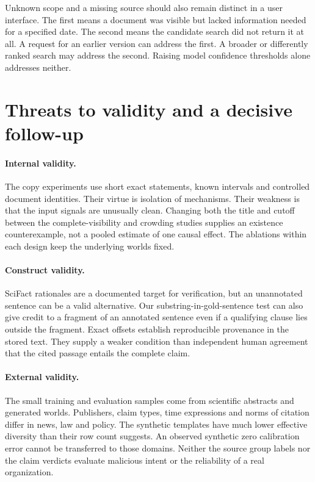 Unknown scope and a missing source should also remain distinct in a user interface. The first means a document was visible but lacked information needed for a specified date. The second means the candidate search did not return it at all. A request for an earlier version can address the first. A broader or differently ranked search may address the second. Raising model confidence thresholds alone addresses neither.

\section{Threats to validity and a decisive follow-up}
\paragraph{Internal validity.} The copy experiments use short exact statements, known intervals and controlled document identities. Their virtue is isolation of mechanisms. Their weakness is that the input signals are unusually clean. Changing both the title and cutoff between the complete-visibility and crowding studies supplies an existence counterexample, not a pooled estimate of one causal effect. The ablations within each design keep the underlying worlds fixed.

\paragraph{Construct validity.} SciFact rationales are a documented target for verification, but an unannotated sentence can be a valid alternative. Our substring-in-gold-sentence test can also give credit to a fragment of an annotated sentence even if a qualifying clause lies outside the fragment. Exact offsets establish reproducible provenance in the stored text. They supply a weaker condition than independent human agreement that the cited passage entails the complete claim.

\paragraph{External validity.} The small training and evaluation samples come from scientific abstracts and generated worlds. Publishers, claim types, time expressions and norms of citation differ in news, law and policy. The synthetic templates have much lower effective diversity than their row count suggests. An observed synthetic zero calibration error cannot be transferred to those domains. Neither the source group labels nor the claim verdicts evaluate malicious intent or the reliability of a real organization.

